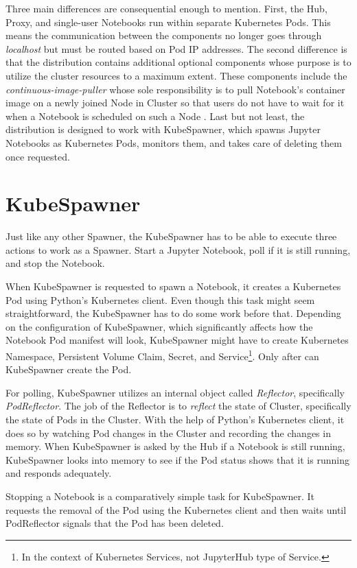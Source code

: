 \documentclass[
  digital,     %
  oneside,     %
  nosansbold,  %
  nocolorbold, %
  lof,         %
  nolot,         %
]{fithesis4}
\begin{document}
Three main differences are consequential enough to mention. First, the Hub, Proxy, and single-user Notebooks run within separate Kubernetes Pods. This means the communication between the components no longer goes through \emph{localhost} but must be routed based on Pod IP addresses. The second difference is that the distribution contains additional optional components whose purpose is to utilize the cluster resources to a maximum extent. These components include the \emph{continuous-image-puller} whose sole responsibility is to pull Notebook's container image on a newly joined Node in Cluster so that users do not have to wait for it when a Notebook is scheduled on such a Node \cite{jupyterhub_optimizations}. Last but not least, the distribution is designed to work with KubeSpawner, which spawns Jupyter Notebooks as Kubernetes Pods, monitors them, and takes care of deleting them once requested.

\section{KubeSpawner}
\label{sec:kubespawner}
Just like any other Spawner, the KubeSpawner has to be able to execute three actions to work as a Spawner. Start a Jupyter Notebook, poll if it is still running, and stop the Notebook.

When KubeSpawner is requested to spawn a Notebook, it creates a Kubernetes Pod using Python's Kubernetes client. Even though this task might seem straightforward, the KubeSpawner has to do some work before that. Depending on the configuration of KubeSpawner, which significantly affects how the Notebook Pod manifest will look, KubeSpawner might have to create Kubernetes Namespace, Persistent Volume Claim, Secret, and Service\footnote{In the context of Kubernetes Services, not JupyterHub type of Service.}.
Only after can KubeSpawner create the Pod.

For polling, KubeSpawner utilizes an internal object called \emph{Reflector}, specifically \emph{PodReflector}. The job of the Reflector is to \emph{reflect} the state of Cluster, specifically the state of Pods in the Cluster. With the help of Python's Kubernetes client, it does so by watching Pod changes in the Cluster and recording the changes in memory. When KubeSpawner is asked by the Hub if a Notebook is still running, KubeSpawner looks into memory to see if the Pod status shows that it is running and responds adequately.

Stopping a Notebook is a comparatively simple task for KubeSpawner. It requests the removal of the Pod using the Kubernetes client and then waits until PodReflector signals that the Pod has been deleted.
\end{document}
